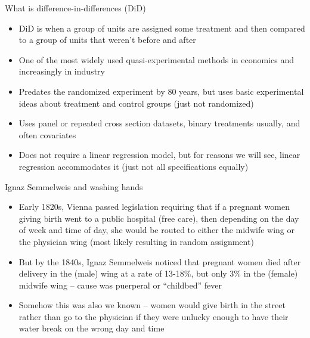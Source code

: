 \documentclass{beamer}
\begin{document}
\begin{frame}{What is difference-in-differences (DiD)}

\begin{itemize}
\item DiD is when a group of units are assigned some treatment and then compared to a group of units that weren't before and after
\item One of the most widely used quasi-experimental methods in economics and increasingly in industry
\item Predates the randomized experiment by 80 years, but uses basic experimental ideas about treatment and control groups (just not randomized)
\item Uses panel or repeated cross section datasets, binary treatments usually, and often covariates 
\item Does not require a linear regression model, but for reasons we will see, linear regression accommodates it (just not all specifications equally)

\end{itemize}
\end{frame}







\begin{frame}{Ignaz Semmelweis and washing hands}

\begin{itemize}
\item Early 1820s, Vienna passed legislation requiring that if a pregnant women giving birth went to a public hospital (free care), then depending on the day of week and time of day, she would be routed to either the midwife wing or the physician wing (most likely resulting in random assignment)
\item But by the 1840s, Ignaz Semmelweis noticed that pregnant women died after delivery in the (male) wing at a rate of 13-18\%, but only 3\% in the (female) midwife wing -- cause was puerperal or “childbed” fever
\item Somehow this was also we known -- women would give birth in the street rather than go to the physician if they were unlucky enough to have their water break on the wrong day and time
\end{itemize}

\end{frame}
\end{document}
